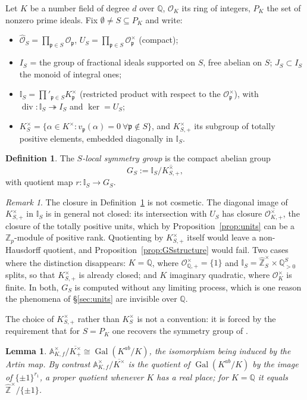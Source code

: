 \documentclass[11pt]{amsart}
\numberwithin{equation}{section}
\newtheorem{lemma}[theorem]{Lemma}
\theoremstyle{definition}
\newtheorem{definition}[theorem]{Definition}
\theoremstyle{remark}
\newtheorem{remark}[theorem]{Remark}
\newcommand{\Z}{\mathbb{Z}}
\newcommand{\Q}{\mathbb{Q}}
\newcommand{\A}{\mathbb{A}}
\newcommand{\hZ}{\widehat{\Z}}
\newcommand{\Gal}{\operatorname{Gal}}
\newcommand{\OK}{\mathcal{O}_K}
\newcommand{\cO}{\mathcal{O}}
\newcommand{\Idl}{\mathbb{I}}
\newcommand{\pp}{\mathfrak{p}}
\newcommand{\hOS}{\widehat{\cO}_S}
\begin{document}
Let $K$ be a number field of degree $d$ over $\Q$, $\OK$ its ring of integers,
$P_K$ the set of nonzero prime ideals. Fix $\emptyset\neq S\subseteq P_K$ and
write:
\begin{itemize}
\item $\hOS=\prod_{\pp\in S}\cO_\pp$, $U_S=\prod_{\pp\in S}\cO_\pp^\times$
(compact);
\item $I_S$ = the group of fractional ideals supported on $S$, free abelian on
$S$; $J_S\subset I_S$ the monoid of integral ones;
\item $\Idl_S=\prod'_{\pp\in S}K_\pp^\times$ (restricted product with respect
to the $\cO_\pp^\times$), with $\operatorname{div}:\Idl_S\twoheadrightarrow I_S$
and $\ker=U_S$;
\item $K^\times_S=\{\alpha\in K^\times: v_\pp(\alpha)=0\ \forall\pp\notin S\}$,
and $K^\times_{S,+}$ its subgroup of totally positive elements, embedded
diagonally in $\Idl_S$.
\end{itemize}

\begin{definition}\label{def:GS}
The \emph{$S$-local symmetry group} is the compact abelian group
\[
G_S:=\Idl_S\big/\overline{K^\times_{S,+}},
\]
with quotient map $r:\Idl_S\to G_S$.
\end{definition}

\begin{remark}\label{rem:closure}
The closure in Definition~\ref{def:GS} is not cosmetic. The diagonal image of
$K^\times_{S,+}$ in $\Idl_S$ is in general not closed: its intersection with $U_S$ has
closure $\overline{\cO^\times_{K,+}}$, the closure of the totally positive units, which by
Proposition~\ref{prop:units} can be a $\Z_p$-module of positive rank. Quotienting by
$K^\times_{S,+}$ itself would leave a non-Hausdorff quotient, and Proposition~\ref{prop:GSstructure}
would fail. Two cases where the distinction disappears: $K=\Q$, where
$\cO^\times_{\Q,+}=\{1\}$ and $\Idl_S=\hZ_S^\times\times\Q^S_{>0}$ splits, so that
$K^\times_{S,+}$ is already closed; and $K$ imaginary quadratic, where $\cO_K^\times$ is
finite. In both, $G_S$ is computed without any limiting process, which is one reason the
phenomena of \S\ref{sec:units} are invisible over $\Q$.
\end{remark}

The choice of $K^\times_{S,+}$ rather than $K^\times_S$ is not a convention: it
is forced by the requirement that for $S=P_K$ one recovers the symmetry group
of \cite{HP,LLN}.

\begin{lemma}\label{lem:gal}
$\A_{K,f}^\times\big/\overline{K^\times_+}\cong\Gal(K^{ab}/K)$, the isomorphism
being induced by the Artin map. By contrast
$\A_{K,f}^\times/\overline{K^\times}$ is the quotient of
$\Gal(K^{ab}/K)$ by the image of $\{\pm1\}^{r_1}$, a proper quotient whenever $K$ has a
real place; for $K=\Q$ it equals $\hZ^\times/\{\pm1\}$.
\end{lemma}
\end{document}
